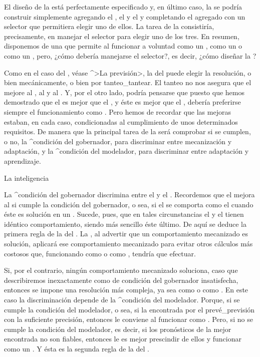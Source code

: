 El diseño de la {\mente} está perfectamente especificado y, en último
caso, la {\mente} se podría construir simplemente agregando el
{\mecanismo}, el {\adaptador} y el {\aprendiz} y completando el agregado
con un selector que permitiera elegir uno de ellos. La tarea de la
{\inteligencia} consistiría, precisamente, en manejar el selector para
elegir uno de los tres. En resumen, disponemos de una {\mente} que
permite al {\conocedor} funcionar a voluntad como un {\mecanismo}, como
un {\adaptador} o como un {\aprendiz}, pero, ¿cómo debería manejarse el
selector?, es decir, ¿cómo diseñar la {\inteligencia}?

Como en el caso del {\gobernador}, véase ^>La previsión>, la
{\inteligencia} del {\conocedor} puede elegir la resolución, o bien
mecánicamente, o bien por tanteo_{tantear}. El tanteo no nos asegura que
el {\conocedor} mejore al {\mecanismo}, al {\adaptador} y al
{\aprendiz}. Y, por el otro lado, podría pensarse que puesto que hemos
demostrado que el {\aprendiz} es mejor que el {\adaptador}, y éste es
mejor que el {\mecanismo}, debería preferirse siempre el funcionamiento
como {\aprendiz}. Pero hemos de recordar que las mejoras estaban, en
cada caso, condicionadas al cumplimiento de unos determinados
requisitos. De manera que la principal tarea de la {\inteligencia} será
comprobar si se cumplen, o no, la ^{condición del gobernador}, para
discriminar entre mecanización y adaptación, y la ^{condición del
modelador}, para discriminar entre adaptación y aprendizaje.


\Section La inteligencia

La ^{condición del gobernador} discrimina entre el {\mecanismo} y el
{\adaptador}. Recordemos que el {\adaptador} mejora al {\mecanismo} si
cumple la condición del gobernador, o sea, si el {\adaptador} se
comporta como el {\mecanismo} cuando éste es solución en un {\universo}.
Sucede, pues, que en tales circunstancias el {\adaptador} y el
{\mecanismo} tienen idéntico comportamiento, siendo más sencillo éste
último. De aquí se deduce la primera regla de la {\inteligencia} del
{\conocedor}. La {\inteligencia}, al advertir que un comportamiento
mecanizado es solución, aplicará ese comportamiento \hbox{mecanizado}
para evitar otros cálculos más costosos que, funcionando como
{\adaptador} o como {\aprendiz}, tendría que efectuar.

Si, por el contrario, ningún comportamiento mecanizado soluciona, caso
que describiremos inexactamente como de condición del gobernador
insatisfecha, entonces se impone una resolución más compleja, ya sea
como {\adaptador} o como {\aprendiz}. En este caso la discriminación
depende de la ^{condición del modelador}. Porque, si se cumple la
condición del modelador, o sea, si la {\realidad} encontrada por el
{\modelador} prevé_{previsión} con la suficiente precisión, entonces le
conviene al {\conocedor} funcionar como {\aprendiz}. Pero, si no se
cumple la condición del modelador, es decir, si los pronósticos de la
mejor {\realidad} encontrada no son fiables, entonces le es mejor
prescindir de ellos y funcionar como un {\adaptador}. Y ésta es la
segunda regla de la {\inteligencia} del {\conocedor}.

